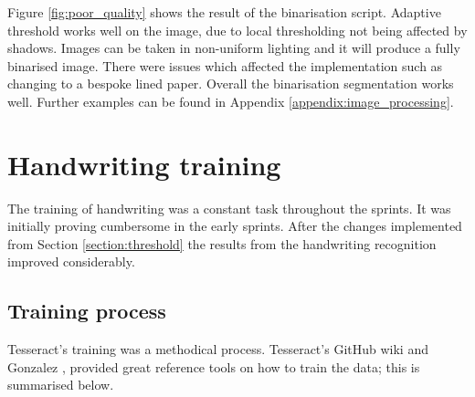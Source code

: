 Figure \ref{fig:poor_quality} shows the result of the binarisation script. Adaptive threshold works well on the image, due to local thresholding not being affected by shadows. Images can be taken in non-uniform lighting and it will produce a fully binarised image. There were issues which affected the implementation such as changing to a bespoke lined paper. Overall the binarisation segmentation works well. Further examples can be found in Appendix \ref{appendix:image_processing}.

\section{Handwriting training}
The training of handwriting was a constant task throughout the sprints. It was initially proving cumbersome in the early sprints. After the changes implemented from Section \ref{section:threshold} the results from the handwriting recognition improved considerably.

\subsection{Training process}
Tesseract's training was a methodical process. Tesseract's GitHub wiki \cite{citeulike:13926796} and Gonzalez \cite{citeulike:13920943}, provided great reference tools on how to train the data; this is summarised below.

